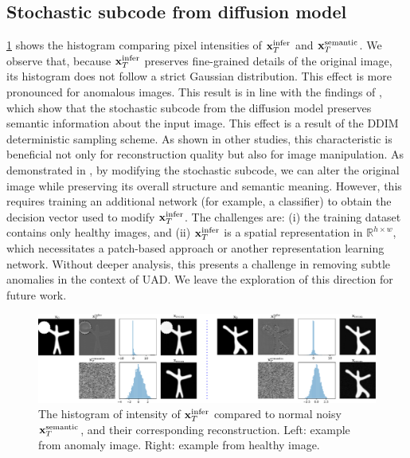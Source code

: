 \subsection{Stochastic subcode from diffusion model}
\cref{fig:compare-infer-hist} shows the histogram comparing pixel intensities of ${\mathbf{x}}_T^{\text{infer}}$ and ${\mathbf{x}}_T^{\text{semantic}}$. We observe that, because ${\mathbf{x}}_T^{\text{infer}}$ preserves fine-grained details of the original image, its histogram does not follow a strict Gaussian distribution. This effect is more pronounced for anomalous images. This result is in line with the findings of \cite{DiffAE,lozuponeLDAE2025}, which show that the stochastic subcode from the diffusion model preserves semantic information about the input image. This effect is a result of the DDIM deterministic sampling scheme. As shown in other studies, this characteristic is beneficial not only for reconstruction quality but also for image manipulation. As demonstrated in \cite{lozuponeLDAE2025}, by modifying the stochastic subcode, we can alter the original image while preserving its overall structure and semantic meaning. However, this requires training an additional network (for example, a classifier) to obtain the decision vector used to modify ${\mathbf{x}}_T^{\text{infer}}$. The challenges are: (i) the training dataset contains only healthy images, and (ii) ${\mathbf{x}}_T^{\text{infer}}$ is a spatial representation in $\mathbb{R}^{h \times w}$, which necessitates a patch-based approach or another representation learning network. Without deeper analysis, this presents a challenge in removing subtle anomalies in the context of UAD. We leave the exploration of this direction for future work.

\begin{figure}[h]
    \centering
    \includegraphics[width=0.75\linewidth]{figures/compare-infer-hist.pdf}
    \caption[Histogram of intensity of random noise and stochastic subcode]{The histogram of intensity of ${\mathbf{x}}_T^{\text{infer}}$ compared to normal noisy ${\mathbf{x}}_T^{\text{semantic}}$, and their corresponding reconstruction. Left: example from anomaly image. Right: example from healthy image.}
    \label{fig:compare-infer-hist}
\end{figure}

